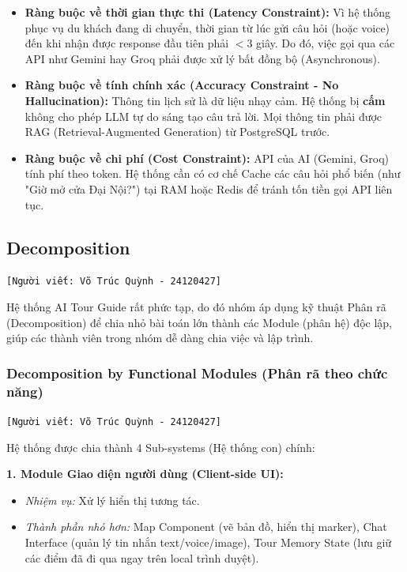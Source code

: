 \begin{itemize}
    \item \textbf{Ràng buộc về thời gian thực thi (Latency Constraint):} Vì hệ thống phục vụ du khách đang di chuyển, thời gian từ lúc gửi câu hỏi (hoặc voice) đến khi nhận được response đầu tiên phải $< 3$ giây. Do đó, việc gọi qua các API như Gemini hay Groq phải được xử lý bất đồng bộ (Asynchronous).
    \item \textbf{Ràng buộc về tính chính xác (Accuracy Constraint - No Hallucination):} Thông tin lịch sử là dữ liệu nhạy cảm. Hệ thống bị \textbf{cấm} không cho phép LLM tự do sáng tạo câu trả lời. Mọi thông tin phải được RAG (Retrieval-Augmented Generation) từ PostgreSQL trước.
    \item \textbf{Ràng buộc về chi phí (Cost Constraint):} API của AI (Gemini, Groq) tính phí theo token. Hệ thống cần có cơ chế Cache các câu hỏi phổ biến (như "Giờ mở cửa Đại Nội?") tại RAM hoặc Redis để tránh tốn tiền gọi API liên tục.
\end{itemize}

\subsection{Decomposition}
\texttt{[Người viết: Võ Trúc Quỳnh - 24120427]}

Hệ thống AI Tour Guide rất phức tạp, do đó nhóm áp dụng kỹ thuật Phân rã (Decomposition) để chia nhỏ bài toán lớn thành các Module (phân hệ) độc lập, giúp các thành viên trong nhóm dễ dàng chia việc và lập trình.

\subsubsection{Decomposition by Functional Modules (Phân rã theo chức năng)}
\texttt{[Người viết: Võ Trúc Quỳnh - 24120427]}

Hệ thống được chia thành 4 Sub-systems (Hệ thống con) chính:

\textbf{1. Module Giao diện người dùng (Client-side UI):}
\begin{itemize}
    \item \textit{Nhiệm vụ:} Xử lý hiển thị tương tác.
    \item \textit{Thành phần nhỏ hơn:} Map Component (vẽ bản đồ, hiển thị marker), Chat Interface (quản lý tin nhắn text/voice/image), Tour Memory State (lưu giữ các điểm đã đi qua ngay trên local trình duyệt).
\end{itemize}

